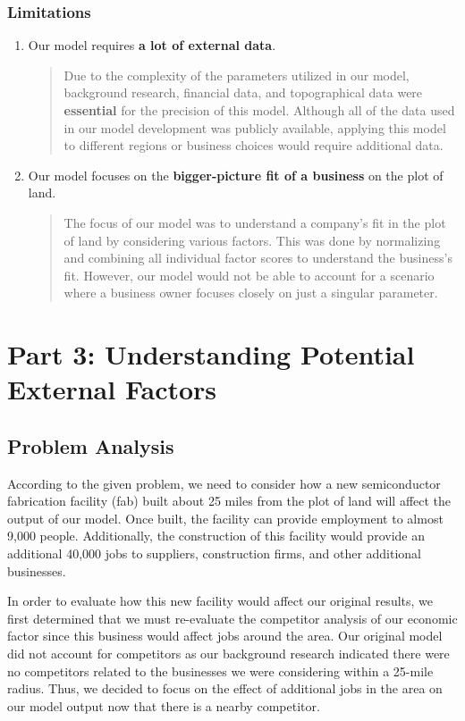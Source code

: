 \documentclass{mcmthesis}
\begin{document}
\subsubsection{Limitations}
\begin{enumerate}
\item Our model requires \textbf{a lot of external data}.
    \begin{quote}
     Due to the complexity of the parameters utilized in our model, background research, financial data, and topographical data were \textbf{essential} for the precision of this model. Although all of the data used in our model development was publicly available, applying this model to different regions or business choices would require additional data. 
    \end{quote}

\item Our model focuses on the \textbf{bigger-picture fit of a business} on the plot of land.
    \begin{quote}
        The focus of our model was to understand a company's fit in the plot of land by considering various factors. This was done by normalizing and combining all individual factor scores to understand the business's fit. However, our model would not be able to account for a scenario where a business owner focuses closely on just a singular parameter.
    \end{quote}
    
\end{enumerate}

\section{Part 3: Understanding Potential External Factors}

\subsection{Problem Analysis}
According to the given problem, we need to consider how a new semiconductor fabrication facility (fab) built about 25 miles from the plot of land will affect the output of our model. Once built, the facility can provide employment to almost 9,000 people. Additionally, the construction of this facility would provide an additional 40,000 jobs to suppliers, construction firms, and other additional businesses.

In order to evaluate how this new facility would affect our original results, we first determined that we must re-evaluate the competitor analysis of our economic factor since this business would affect jobs around the area. Our original model did not account for competitors as our background research indicated there were no competitors related to the businesses we were considering within a 25-mile radius. Thus, we decided to focus on the effect of additional jobs in the area on our model output now that there is a nearby competitor.
\end{document}
